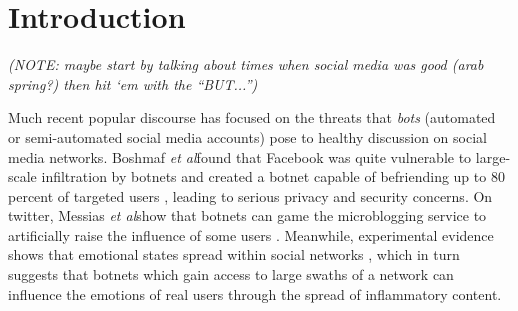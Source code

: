 \documentclass[sigconf,authordraft]{acmart}
\newcommand{\etal}{{\itshape et al}}
\begin{document}



\maketitle

\section{Introduction}

\textit{(NOTE: maybe start by talking about times when social media was good (arab spring?) then hit `em with the ``BUT...'')}

Much recent popular discourse has focused on the threats that {\itshape bots} (automated or semi-automated social media accounts) pose to healthy discussion on social media networks. Boshmaf \etal found that Facebook was quite vulnerable to large-scale infiltration by botnets and created a botnet capable of befriending up to 80 percent of targeted users \cite{boshmaf2013design}, leading to serious privacy and security concerns. On twitter, Messias \etal show that botnets can game the microblogging service to artificially raise the influence of some users \cite{messias2013you}. Meanwhile, experimental evidence shows that emotional states spread within social networks \cite{kramer2014experimental}, which in turn suggests that botnets which gain access to large swaths of a network can influence the emotions of real users through the spread of inflammatory content. 
\end{document}
